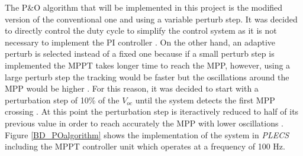 The P\&O algorithm that will be implemented in this project is the  modified version of the conventional one and using a variable perturb step. It was decided to directly control the duty cycle to simplify the control system as it is not necessary to implement the PI controller . On the other hand, an adaptive perturb is selected instead of a fixed one because if a small perturb step is implemented the MPPT takes longer time to reach the MPP, however, using a large perturb step the tracking would be faster but the oscillations around the MPP would be higher . For this reason, it was decided to start with a perturbation step of 10\% of the $V_{oc}$ until the system detects the first MPP crossing . At this point the perturbation step is iteractively reduced to half of its previous value in order to reach accurately the MPP with lower oscillations . Figure \ref{BD_POalgorithm} shows the implementation of the system in \textit{PLECS} including the MPPT controller unit which operates at a frequency of 100 Hz. 

